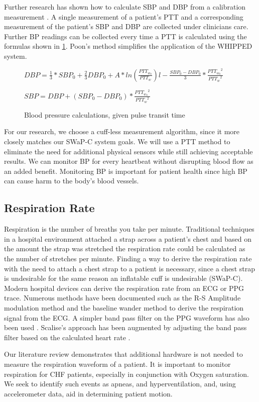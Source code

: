 Further research has shown how to calculate SBP and DBP from a calibration measurement \cite{Poon2005}. A single measurement of a patient's PTT and a corresponding measurement of the patient's SBP and DBP are collected under clinicians care. Further BP readings can be collected every time a PTT is calculated using the formulas shown in \cref{fig:BPCalc}.\cite{Poon2005} Poon's method simplifies the application of the WHIPPED system.

\begin{figure}
	\begin{center}

		\label{fig:BPCalc}
		
		$DBP=\frac{1}{3}*SBP_{0} + \frac{2}{3}DBP_{0} + A*ln(\frac{PTT_{w_{0}}}{PTT_{w}})l-\frac{SBP_{0} - DBP_{0}}{3}*\frac{{PTT_{w_{0}}}^{2}}{{PTT_{w}}^{2}}$
		
		$SBP=DBP+(SBP_{0}-DBP_{0})*\frac{{PTT_{w_{0}}}^2}{{PTT_{w}}^2}$
		\caption{Blood pressure calculations, given pulse transit time }
	\end{center}
\end{figure}

For our research, we choose a cuff-less measurement algorithm, since it more closely matches our SWaP-C system goals. We will use a PTT method to eliminate the need for additional physical sensors while still achieving acceptable results. We can monitor BP for every heartbeat without disrupting blood flow as an added benefit. Monitoring BP is important for patient health since high BP can cause harm to the body's blood vessels.

\subsection{Respiration Rate}
\label{subsec:RespirationRate}

Respiration is the number of breaths you take per minute. Traditional techniques in a hospital environment attached a strap across a patient's chest and based on the amount the strap was stretched the respiration rate could be calculated as the number of stretches per minute. Finding a way to derive the respiration rate with the need to attach a chest strap to a patient is necessary, since a chest strap is undesirable for the same reason an inflatable cuff is undesirable (SWaP-C). Modern hospital devices can derive the respiration rate from an ECG or PPG trace. Numerous methods have been documented such as the R-S Amplitude modulation method \cite{Dziuda2011} \cite{Noor2011} and the baseline wander method \cite{Scully2012} \cite{Ponomarenko2005} to derive the respiration signal from the ECG. A simpler band pass filter on the PPG waveform has also been used \cite{Scalise2011}. Scalise's approach has been augmented by adjusting the band pass filter based on the calculated heart rate \cite{Mason2002}.

Our literature review demonstrates that additional hardware is not needed to measure the respiration waveform of a patient. It is important to monitor respiration for CHF patients, especially in conjunction with Oxygen saturation. We seek to identify such events as apneas, and hyperventilation, and, using accelerometer data, aid in determining patient motion.
